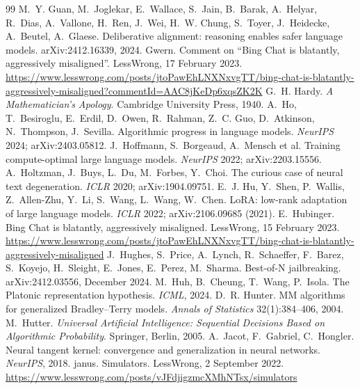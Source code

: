 \begin{thebibliography}{99}
 M.~Y. Guan, M.~Joglekar, E.~Wallace, S.~Jain, B.~Barak, A.~Helyar, R.~Dias, A.~Vallone, H.~Ren, J.~Wei, H.~W. Chung, S.~Toyer, J.~Heidecke, A.~Beutel, A.~Glaese. Deliberative alignment: reasoning enables safer language models. arXiv:2412.16339, 2024.
 Gwern. Comment on ``Bing Chat is blatantly, aggressively misaligned''. LessWrong, 17 February 2023. \url{https://www.lesswrong.com/posts/jtoPawEhLNXNxvgTT/bing-chat-is-blatantly-aggressively-misaligned?commentId=AAC8jKeDp6xqsZK2K}
 G.~H. Hardy. \emph{A Mathematician's Apology}. Cambridge University Press, 1940.
 A.~Ho, T.~Besiroglu, E.~Erdil, D.~Owen, R.~Rahman, Z.~C. Guo, D.~Atkinson, N.~Thompson, J.~Sevilla. Algorithmic progress in language models. \emph{NeurIPS} 2024; arXiv:2403.05812.
 J.~Hoffmann, S.~Borgeaud, A.~Mensch et al. Training compute-optimal large language models. \emph{NeurIPS} 2022; arXiv:2203.15556.
 A.~Holtzman, J.~Buys, L.~Du, M.~Forbes, Y.~Choi. The curious case of neural text degeneration. \emph{ICLR} 2020; arXiv:1904.09751.
 E.~J. Hu, Y.~Shen, P.~Wallis, Z.~Allen-Zhu, Y.~Li, S.~Wang, L.~Wang, W.~Chen. LoRA: low-rank adaptation of large language models. \emph{ICLR} 2022; arXiv:2106.09685 (2021).
 E.~Hubinger. Bing Chat is blatantly, aggressively misaligned. LessWrong, 15 February 2023. \url{https://www.lesswrong.com/posts/jtoPawEhLNXNxvgTT/bing-chat-is-blatantly-aggressively-misaligned}
 J.~Hughes, S.~Price, A.~Lynch, R.~Schaeffer, F.~Barez, S.~Koyejo, H.~Sleight, E.~Jones, E.~Perez, M.~Sharma. Best-of-N jailbreaking. arXiv:2412.03556, December 2024.
 M.~Huh, B.~Cheung, T.~Wang, P.~Isola. The Platonic representation hypothesis. \emph{ICML}, 2024.
 D.~R. Hunter. MM algorithms for generalized Bradley--Terry models. \emph{Annals of Statistics} 32(1):384--406, 2004.
 M.~Hutter. \emph{Universal Artificial Intelligence: Sequential Decisions Based on Algorithmic Probability}. Springer, Berlin, 2005.
 A.~Jacot, F.~Gabriel, C.~Hongler. Neural tangent kernel: convergence and generalization in neural networks. \emph{NeurIPS}, 2018.
 janus. Simulators. LessWrong, 2 September 2022. \url{https://www.lesswrong.com/posts/vJFdjigzmcXMhNTsx/simulators}

\end{thebibliography}
